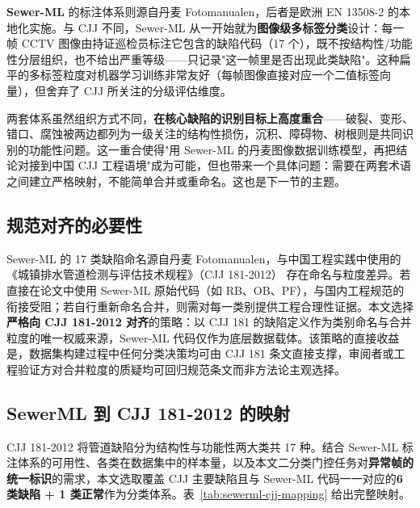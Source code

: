 \documentclass[UTF8,openany,12pt]{ctexbook}
\begin{document}
\textbf{Sewer-ML}\cite{haurum2021sewerml} 的标注体系则源自丹麦 Fotomanualen，后者是欧洲 EN 13508-2 的本地化实施。与 CJJ 不同，Sewer-ML 从一开始就为\textbf{图像级多标签分类}设计：每一帧 CCTV 图像由持证巡检员标注它包含的缺陷代码（17 个），既不按结构性/功能性分层组织，也不给出严重等级——只记录"这一帧里是否出现此类缺陷"。这种扁平的多标签粒度对机器学习训练非常友好（每帧图像直接对应一个二值标签向量），但舍弃了 CJJ 所关注的分级评估维度。

两套体系虽然组织方式不同，\textbf{在核心缺陷的识别目标上高度重合}——破裂、变形、错口、腐蚀被两边都列为一级关注的结构性损伤，沉积、障碍物、树根则是共同识别的功能性问题。这一重合使得"用 Sewer-ML 的丹麦图像数据训练模型，再把结论对接到中国 CJJ 工程语境"成为可能，但也带来一个具体问题：需要在两套术语之间建立严格映射，不能简单合并或重命名。这也是下一节的主题。

\subsection{规范对齐的必要性}
\label{sec:cjj-mapping-mapping}
Sewer-ML 的 17 类缺陷命名源自丹麦 Fotomanualen，与中国工程实践中使用的《城镇排水管道检测与评估技术规程》（CJJ 181-2012）\cite{cjj181} 存在命名与粒度差异。若直接在论文中使用 Sewer-ML 原始代码（如 RB、OB、PF），与国内工程规范的衔接受阻；若自行重新命名合并，则需对每一类别提供工程合理性证据。本文选择\textbf{严格向 CJJ 181-2012 对齐}的策略：以 CJJ 181 的缺陷定义作为类别命名与合并粒度的唯一权威来源，Sewer-ML 代码仅作为底层数据载体。该策略的直接收益是，数据集构建过程中任何分类决策均可由 CJJ 181 条文直接支撑，审阅者或工程验证方对合并粒度的质疑均可回归规范条文而非方法论主观选择。

\subsection{SewerML 到 CJJ 181-2012 的映射}
CJJ 181-2012 将管道缺陷分为结构性与功能性两大类共 17 种。结合 Sewer-ML 标注体系的可用性、各类在数据集中的样本量，以及本文二分类门控任务对\textbf{异常帧的统一标识}的需求，本文选取覆盖 CJJ 主要缺陷且与 Sewer-ML 代码一一对应的\textbf{6 类缺陷 + 1 类正常}作为分类体系。表~\ref{tab:sewerml-cjj-mapping} 给出完整映射。
\end{document}

